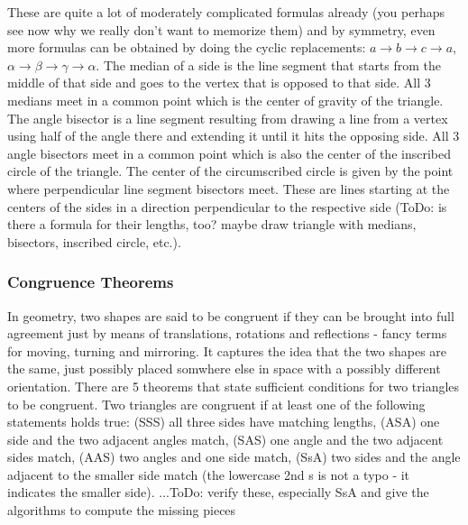These are quite a lot of moderately complicated formulas already (you perhaps see now why we really don't want to memorize them) and by symmetry, even more formulas can be obtained by doing the cyclic replacements: $a \rightarrow b \rightarrow c \rightarrow a$, $\alpha \rightarrow \beta \rightarrow \gamma \rightarrow \alpha$. The median of a side is the line segment that starts from the middle of that side and goes to the vertex that is opposed to that side. All 3 medians meet in a common point which is the center of gravity of the triangle. The angle bisector is a line segment resulting from drawing a line from a vertex using half of the angle there and extending it until it hits the opposing side. All 3 angle bisectors meet in a common point which is also the center of the inscribed circle of the triangle. The center of the circumscribed circle is given by the point where perpendicular line segment bisectors meet. These are lines starting at the centers of the sides in a direction perpendicular to the respective side (ToDo: is there a formula for their lengths, too? maybe draw triangle with medians, bisectors, inscribed circle, etc.).


\subsubsection{Congruence Theorems}
In geometry, two shapes are said to be congruent if they can be brought into full agreement just by means of translations, rotations and reflections - fancy terms for moving, turning and mirroring. It captures the idea that the two shapes are the same, just possibly placed somwhere else in space with a possibly different orientation. There are 5 theorems that state sufficient conditions for two triangles to be congruent. Two triangles are congruent if at least one of the following statements holds true: (SSS) all three sides have matching lengths, (ASA) one side and the two adjacent angles match, (SAS) one angle and the two adjacent sides match, (AAS) two angles and one side match, (SsA) two sides and the angle adjacent to the smaller side match (the lowercase 2nd s is not a typo - it indicates the smaller side). ...ToDo: verify these, especially SsA and give the algorithms to compute the missing pieces

